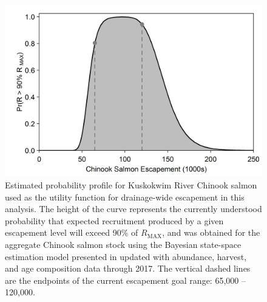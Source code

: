 \documentclass[12pt,]{book}
\theoremstyle{definition}
\theoremstyle{definition}
\theoremstyle{definition}
\theoremstyle{remark}
\begin{document}
\begin{singlespace}
\begin{figure}
  \centering
  \includegraphics{img/Ch3/R-max-profile.jpg}
  \caption{Estimated probability profile for Kuskokwim River Chinook salmon used as the utility function for drainage-wide escapement in this analysis. The height of the curve represents the currently understood probability that expected recruitment produced by a given escapement level will exceed 90\% of $R_{\text{MAX}}$, and was obtained for the aggregate Chinook salmon stock using the Bayesian state-space estimation model presented in \cite{hamazaki-etal-2012} updated with abundance, harvest, and age composition data through 2017. The vertical dashed lines are the endpoints of the current escapement goal range: 65,000 -- 120,000.}
  \label{fig:R-max-profile}
\end{figure}


\end{singlespace}
\end{document}
